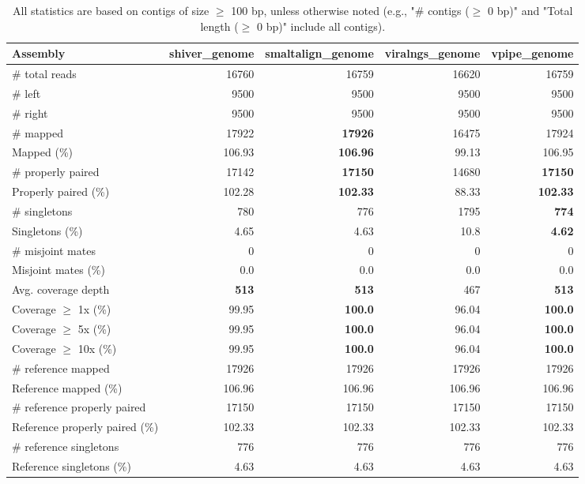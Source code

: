 \documentclass[12pt,a4paper]{article}
\begin{document}
\begin{table}[ht]
\begin{center}
\caption{All statistics are based on contigs of size $\geq$ 100 bp, unless otherwise noted (e.g., "\# contigs ($\geq$ 0 bp)" and "Total length ($\geq$ 0 bp)" include all contigs).}
\begin{tabular}{|l*{4}{|r}|}
\hline
Assembly & shiver\_genome & smaltalign\_genome & viralngs\_genome & vpipe\_genome \\ \hline
\# total reads & 16760 & 16759 & 16620 & 16759 \\ \hline
\# left & 9500 & 9500 & 9500 & 9500 \\ \hline
\# right & 9500 & 9500 & 9500 & 9500 \\ \hline
\# mapped & 17922 & {\bf 17926} & 16475 & 17924 \\ \hline
Mapped (\%) & 106.93 & {\bf 106.96} & 99.13 & 106.95 \\ \hline
\# properly paired & 17142 & {\bf 17150} & 14680 & {\bf 17150} \\ \hline
Properly paired (\%) & 102.28 & {\bf 102.33} & 88.33 & {\bf 102.33} \\ \hline
\# singletons & 780 & 776 & 1795 & {\bf 774} \\ \hline
Singletons (\%) & 4.65 & 4.63 & 10.8 & {\bf 4.62} \\ \hline
\# misjoint mates & 0 & 0 & 0 & 0 \\ \hline
Misjoint mates (\%) & 0.0 & 0.0 & 0.0 & 0.0 \\ \hline
Avg. coverage depth & {\bf 513} & {\bf 513} & 467 & {\bf 513} \\ \hline
Coverage $\geq$ 1x (\%) & 99.95 & {\bf 100.0} & 96.04 & {\bf 100.0} \\ \hline
Coverage $\geq$ 5x (\%) & 99.95 & {\bf 100.0} & 96.04 & {\bf 100.0} \\ \hline
Coverage $\geq$ 10x (\%) & 99.95 & {\bf 100.0} & 96.04 & {\bf 100.0} \\ \hline
\# reference mapped & 17926 & 17926 & 17926 & 17926 \\ \hline
Reference mapped (\%) & 106.96 & 106.96 & 106.96 & 106.96 \\ \hline
\# reference properly paired & 17150 & 17150 & 17150 & 17150 \\ \hline
Reference properly paired (\%) & 102.33 & 102.33 & 102.33 & 102.33 \\ \hline
\# reference singletons & 776 & 776 & 776 & 776 \\ \hline
Reference singletons (\%) & 4.63 & 4.63 & 4.63 & 4.63 \\ \hline

\end{tabular}
\end{center}
\end{table}
\end{document}
